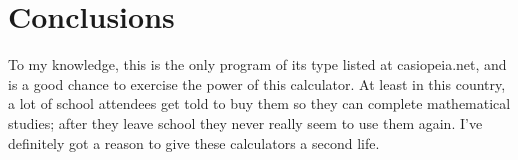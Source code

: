 \documentclass[]{article}
\begin{document}
\section{Conclusions}
To my knowledge, this is the only program of its type listed at casiopeia.net,
and is a good chance to exercise the power of this calculator. At least in this
country, a lot of school attendees get told to buy them so they can complete
mathematical studies; after they leave school they never really seem to use them
again. I've definitely got a reason to give these calculators a second life.
\end{document}
